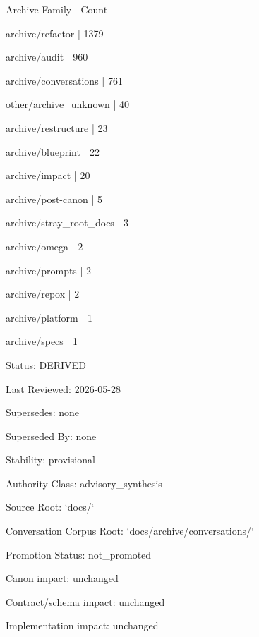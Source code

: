 \documentclass[11pt,a4paper]{report}
\begin{document}
{\small\ttfamily\raggedright Archive Family | Count\par}
{\small\ttfamily\raggedright archive/\allowbreak{}refactor | 1379\par}
{\small\ttfamily\raggedright archive/\allowbreak{}audit | 960\par}
{\small\ttfamily\raggedright archive/\allowbreak{}conversations | 761\par}
{\small\ttfamily\raggedright other/\allowbreak{}archive\_unknown | 40\par}
{\small\ttfamily\raggedright archive/\allowbreak{}restructure | 23\par}
{\small\ttfamily\raggedright archive/\allowbreak{}blueprint | 22\par}
{\small\ttfamily\raggedright archive/\allowbreak{}impact | 20\par}
{\small\ttfamily\raggedright archive/\allowbreak{}post-\allowbreak{}canon | 5\par}
{\small\ttfamily\raggedright archive/\allowbreak{}stray\_root\_docs | 3\par}
{\small\ttfamily\raggedright archive/\allowbreak{}omega | 2\par}
{\small\ttfamily\raggedright archive/\allowbreak{}prompts | 2\par}
{\small\ttfamily\raggedright archive/\allowbreak{}repox | 2\par}
{\small\ttfamily\raggedright archive/\allowbreak{}platform | 1\par}
{\small\ttfamily\raggedright archive/\allowbreak{}specs | 1\par}


Status: DERIVED

Last Reviewed: 2026-\allowbreak{}05-\allowbreak{}28

Supersedes: none

Superseded By: none

Stability: provisional

Authority Class: advisory\_synthesis

Source Root: `docs/\allowbreak{}`

Conversation Corpus Root: `docs/\allowbreak{}archive/\allowbreak{}conversations/\allowbreak{}`

Promotion Status: not\_promoted

Canon impact: unchanged

Contract/\allowbreak{}schema impact: unchanged

Implementation impact: unchanged
\end{document}
